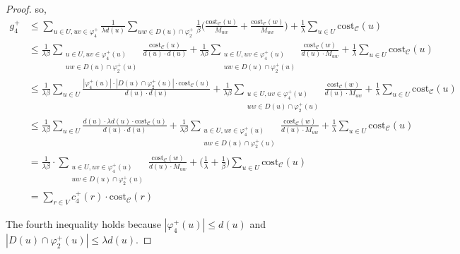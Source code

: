 \documentclass[11pt]{article}
\newcommand{\cost}{\mathrm{cost}}
\newcommand{\calC}{{\mathcal{C}}}
\begin{document}
\begin{CJK*}{UTF8}{gbsn}
\begin{proof}
so, 
\begin{align*}
    g^+_4 &\leq \sum_{u \in U, uv \in \varphi^+_4} \frac{1}{\lambda d(u)}  \sum_{uw \in D(u) \cap \varphi^+_2}\frac{1}{\beta} \big( \frac{\cost_{\mathcal{C}}(u)}{M_{uw}}+ \frac{\cost_{\mathcal{C}}(w)}{M_{uw}}\big) + \frac{1}{\lambda} \sum_{u \in U} \cost_{\calC}(u) \\
    &\leq \frac{1}{\lambda\beta} \sum_{\substack{u \in U, uv \in \varphi^+_4(u) \\ uw \in D(u) \cap \varphi^+_2(u)}} \frac{\cost_{\mathcal{C}}(u)}{d(u) \cdot d(u)}+ \frac{1}{\lambda\beta}\sum_{\substack{u \in U, uv \in \varphi^+_4(u) \\ uw \in D(u) \cap \varphi^+_2(u)}} 
 \frac{\cost_{\mathcal{C}}(w)}{d(u) \cdot M_{uw}} + \frac{1}{\lambda} \sum_{u \in U} \cost_{\calC}(u) \\
     &\leq \frac{1}{\lambda\beta} \sum_{u \in U} \frac{|\varphi^+_4(u)|\cdot |D(u) \cap \varphi^+_2(u)|\cdot \cost_{\mathcal{C}}(u)}{d(u) \cdot d(u)}+ \frac{1}{\lambda\beta} \sum_{\substack{u \in U, uv \in \varphi^+_4(u) \\ uw \in D(u) \cap \varphi^+_2(u)}} 
 \frac{\cost_{\mathcal{C}}(w)}{d(u) \cdot M_{uw}} + \frac{1}{\lambda} \sum_{u \in U} \cost_{\calC}(u) \\
      &\leq \frac{1}{\lambda\beta} \sum_{u \in U} \frac{d(u)\cdot \lambda d(u) \cdot \cost_{\mathcal{C}}(u)}{d(u) \cdot d(u)}+ \frac{1}{\lambda\beta} \sum_{\substack{u \in U, uv \in \varphi^+_4(u) \\ uw \in D(u) \cap \varphi^+_2(u)}} 
 \frac{\cost_{\mathcal{C}}(w)}{d(u) \cdot M_{uw}} + \frac{1}{\lambda} \sum_{u \in U} \cost_{\calC}(u) \\
      &= \frac{1}{\lambda\beta} \cdot \sum_{\substack{u \in U, uv \in \varphi^+_4(u) \\ uw \in D(u) \cap \varphi^+_2(u)}} 
 \frac{\cost_{\mathcal{C}}(w)}{d(u) \cdot M_{uw}}+ \big(\frac{1}{\lambda} + \frac{1}{\beta} \big)\sum_{u \in U} \cost_{\mathcal{C}}(u) \\
 &= \sum_{r \in V} c^+_4(r) \cdot \cost_{\mathcal{C}}(r) 
\end{align*}

The fourth inequality holds because $|\varphi^+_4(u)| \leq d(u)$ and $|D(u) \cap \varphi^+_2(u)| \leq \lambda d(u)$.



\end{proof}
\end{CJK*}
\end{document}
